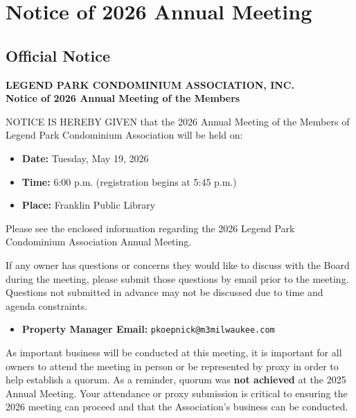\documentclass[11pt]{article}
\newcommand{\strong}[1]{\textbf{#1}}
\begin{document}
\newpage

\section{Notice of 2026 Annual Meeting}

\subsection*{Official Notice}
\vspace{-0.5em}

\noindent
\textbf{LEGEND PARK CONDOMINIUM ASSOCIATION, INC.}\\[0.5em]
\textbf{Notice of 2026 Annual Meeting of the Members}

\vspace{0.75em}

\noindent
NOTICE IS HEREBY GIVEN that the 2026 Annual Meeting of the Members of Legend Park
Condominium Association will be held on:

\begin{itemize}[leftmargin=1.1em]
    \item \strong{Date:} Tuesday, May 19, 2026
    \item \strong{Time:} 6{:}00 p.m. (registration begins at 5{:}45 p.m.)
    \item \strong{Place:} Franklin Public Library
\end{itemize}

Please see the enclosed information regarding the 2026 Legend Park Condominium Association
Annual Meeting.

If any owner has questions or concerns they would like to discuss with the Board during the
meeting, please submit those questions by email prior to the meeting. Questions not submitted
in advance may not be discussed due to time and agenda constraints.

\begin{itemize}[leftmargin=1.1em]
    \item \strong{Property Manager Email:} \texttt{pkoepnick@m3milwaukee.com}
\end{itemize}

As important business will be conducted at this meeting, it is important for all owners to
attend the meeting in person or be represented by proxy in order to help establish a quorum.
As a reminder, quorum was \textbf{not achieved} at the 2025 Annual Meeting. Your attendance
or proxy submission is critical to ensuring the 2026 meeting can proceed and that the
Association's business can be conducted.
\end{document}
